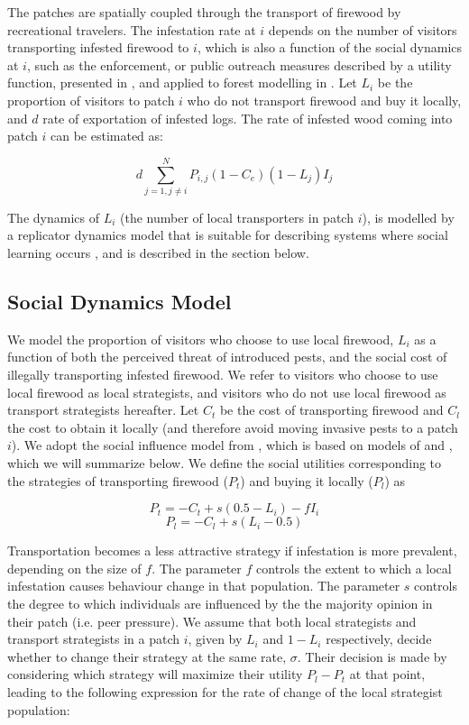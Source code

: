 The patches are spatially coupled through the transport of firewood by recreational travelers. The infestation rate at $i$ depends on the number of visitors transporting infested firewood to $i$, which is also a function of the social dynamics at $i$, such as the enforcement, or public outreach measures described by a utility function, presented in \cite{bauch2005imitation}, and applied to forest modelling in \cite{barlow2014modelling,satake2007coupled}. Let $L_i$ be the proportion of visitors to patch $i$ who do not transport firewood and buy it locally, and $d$ rate of exportation of infested logs. The rate of infested wood coming into patch $i$ can be estimated as:

$$d\sum_{j = 1, j\neq i}^N P_{i,j} (1 - C_e) (1 - L_j)I_j$$
 
The dynamics of $L_i$ (the number of local transporters in patch $i$), is modelled by a replicator dynamics model that is suitable for describing systems where social learning occurs \cite{bauch2005imitation,hofbauer1998evolutionary}, and is described in the section below. 

\subsection{Social Dynamics Model}

We model the proportion of visitors who choose to use local firewood, $L_i$ as a function of both the perceived threat of introduced pests, and the social cost of illegally transporting infested firewood. We refer to visitors who choose to use local firewood as local strategists, and visitors who do not use local firewood as transport strategists hereafter. Let $C_t$ be the cost of transporting firewood and $C_l$ the cost to obtain it locally (and therefore avoid moving invasive pests to a patch $i$). We adopt the social influence model from \cite{barlow2014modelling}, which is based on models of \cite{bauch2005imitation} and \cite{ hofbauer1998evolutionary}, which we will summarize below.
We define the social utilities corresponding to the strategies of transporting firewood ($P_t$) and buying it locally ($P_l$) as 

$$P_t  = - C_t + s(0.5 - L_i) - f I_i$$
$$P_l = - C_l + s(L_i - 0.5)$$

Transportation becomes a less attractive strategy if infestation is more prevalent, depending on the size of $f$. The parameter $f$ controls the extent to which a local infestation causes behaviour change in that population. The parameter $s$ controls the degree to which individuals are influenced by the the majority opinion in their patch (i.e. peer pressure). We assume that both local strategists and transport strategists in a patch $i$, given by $L_i$ and $1 - L_i$ respectively, decide whether to change their strategy at the same rate, $\sigma$. Their decision is made by considering which strategy will maximize their utility $P_l - P_t$ at that point, leading to the following expression for the rate of change of the local strategist population:

